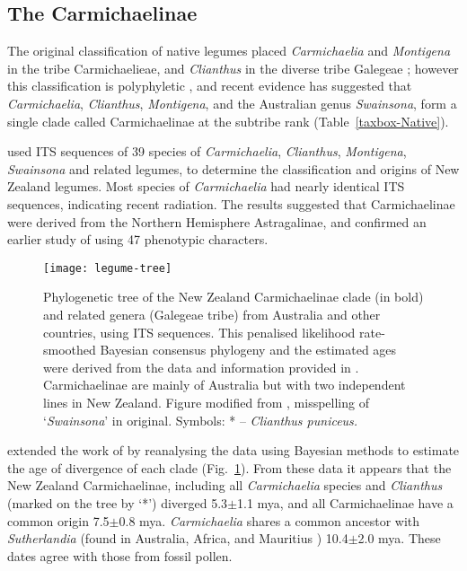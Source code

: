 \subsection{The Carmichaelinae}

The original classification of native legumes placed
\emph{Carmichaelia} and \emph{Montigena} in the tribe
Carmichaelieae, and \emph{Clianthus} in the diverse tribe Galegeae
\citep{Pohill81-Carm}; however this classification is polyphyletic
\citep{Wagstaff99}, and recent evidence has suggested that
\emph{Carmichaelia}, \emph{Clianthus}, \emph{Montigena}, and the
Australian genus \emph{Swainsona}, form a single clade called
Carmichaelinae at the subtribe rank \citep{Wagstaff99}
(Table~\ref{taxbox-Native}).

\citet{Wagstaff99} used ITS sequences of 39 species of
\emph{Carmichaelia}, \emph{Clianthus}, \emph{Montigena},
\emph{Swainsona} and related legumes, to determine the
classification and origins of New Zealand legumes. Most species of
\emph{Carmichaelia} had nearly identical ITS sequences, indicating
recent radiation. The results suggested that Carmichaelinae were
derived from the Northern Hemisphere Astragalinae, and confirmed an
earlier study of \citet{Heenan98a} using 47 phenotypic characters.

\begin{figure} [tbp]
    \centering
    \texttt{[image: legume-tree]}
    \caption[Carmichaelinae phylogenetic tree]{Phylogenetic tree of the New Zealand
    Carmichaelinae clade (in bold) and related genera (Galegeae tribe) from Australia
    and other countries, using ITS sequences. This
    penalised likelihood rate-smoothed Bayesian consensus phylogeny and
    the estimated ages were derived from the data and information
    provided in \citet{Wagstaff99}. Carmichaelinae are mainly of
    Australia but with two independent lines in New Zealand. Figure
    modified from \citet{Lavin04}, misspelling of `\emph{Swainsona}' in original. Symbols: * -- \emph{Clianthus puniceus.}}
    \label{p-legume-tree}
\end{figure}

\citet{Lavin04} extended the work of \citet{Wagstaff99} by
reanalysing the data using Bayesian methods to estimate the age of
divergence of each clade (Fig.~\ref{p-legume-tree}). From these data
it appears that the New Zealand Carmichaelinae, including all
\emph{Carmichaelia} species and \emph{Clianthus} (marked on the tree
by `*') diverged 5.3$\pm$1.1 mya, and all Carmichaelinae have a
common origin 7.5$\pm$0.8 mya. \emph{Carmichaelia} shares a common
ancestor with \emph{Sutherlandia} (found in Australia, Africa, and
Mauritius \citep{ILDIS}) 10.4$\pm$2.0 mya. These dates agree with
those from fossil pollen.

